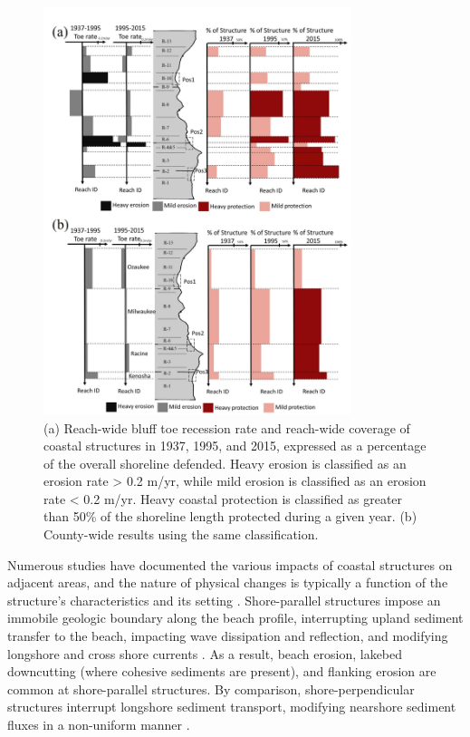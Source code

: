 \begin{figure}[htbp] \centering
\includegraphics[width=0.8\textwidth]{chapter2/resources/figure2-6.jpg}
\caption{(a) Reach-wide bluff toe recession rate and reach-wide coverage of
coastal structures in 1937, 1995, and 2015, expressed as a percentage of the
overall shoreline defended. Heavy erosion is classified as an erosion rate > 0.2
m/yr, while mild erosion is classified as an erosion rate < 0.2 m/yr. Heavy
coastal protection is classified as greater than 50\% of the shoreline length
protected during a given year. (b) County-wide results using the same
classification. } 
\label{fig:fig2.6} 
\end{figure} 

Numerous studies have documented the various impacts of coastal structures on
adjacent areas, and the nature of physical changes is typically a function of
the structure’s characteristics and its setting
\citep[\eg][]{kraus1996effects}.  Shore-parallel structures impose an immobile
geologic boundary along the beach profile, interrupting upland sediment transfer
to the beach, impacting wave dissipation and reflection, and modifying longshore
and cross shore currents \citep{lin_field_2014,miles2001field}. As a result,
beach erosion, lakebed downcutting (where cohesive sediments are present), and
flanking erosion are common at shore-parallel structures. By comparison,
shore-perpendicular structures interrupt longshore sediment transport, modifying
nearshore sediment fluxes in a non-uniform manner
\citep{bruun1995development,bruun2001development}. 

